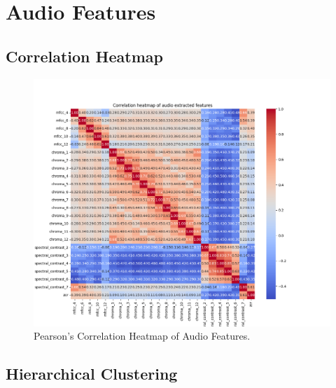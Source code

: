 \section{Audio Features}

\subsection*{Correlation Heatmap}
\label{sec:correlationheatmapsspotifyfeatures}

\begin{center}
\begin{figure}[H]
  \centering
  \includegraphics[width=6in]{img/corr_heatmap_audio.png}
  \caption{Pearson's Correlation Heatmap of Audio Features.}
  \label{Figure:fig_beh}
\end{figure}
\end{center}

\subsection*{Hierarchical Clustering}
\label{sec:hierarchicalclustering}

